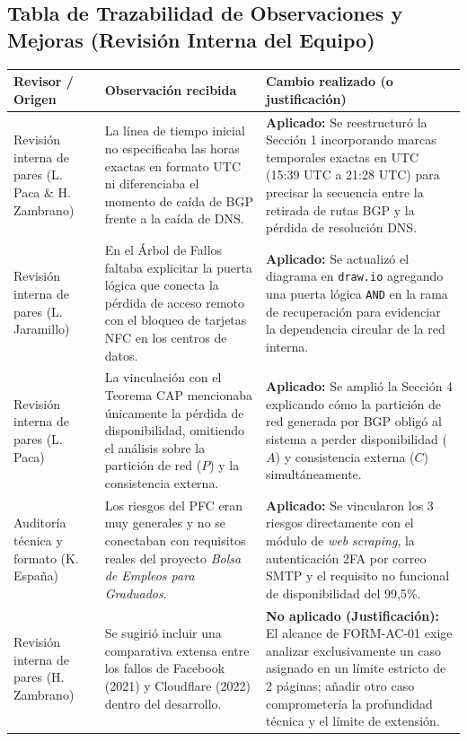 \documentclass[10pt,a4paper]{article}
\renewcommand{\arraystretch}{1.05}
\begin{document}
\begin{table}[t]
\subsection*{Tabla de Trazabilidad de Observaciones y Mejoras (Revisión Interna del Equipo)}
\centering
\scriptsize
\renewcommand{\arraystretch}{1.25}
\begin{tabularx}{\textwidth}{|p{}|X|X|}
\hline
\textbf{Revisor / Origen} & \textbf{Observación recibida} & \textbf{Cambio realizado (o justificación)} \\ \hline
Revisión interna de pares (L. Paca \& H. Zambrano) & La línea de tiempo inicial no especificaba las horas exactas en formato UTC ni diferenciaba el momento de caída de BGP frente a la caída de DNS. & \textbf{Aplicado:} Se reestructuró la Sección 1 incorporando marcas temporales exactas en UTC (15:39 UTC a 21:28 UTC) para precisar la secuencia entre la retirada de rutas BGP y la pérdida de resolución DNS. \\ \hline
Revisión interna de pares (L. Jaramillo) & En el Árbol de Fallos faltaba explicitar la puerta lógica que conecta la pérdida de acceso remoto con el bloqueo de tarjetas NFC en los centros de datos. & \textbf{Aplicado:} Se actualizó el diagrama en \texttt{draw.io} agregando una puerta lógica \texttt{AND} en la rama de recuperación para evidenciar la dependencia circular de la red interna. \\ \hline
Revisión interna de pares (L. Paca) & La vinculación con el Teorema CAP mencionaba únicamente la pérdida de disponibilidad, omitiendo el análisis sobre la partición de red ($P$) y la consistencia externa. & \textbf{Aplicado:} Se amplió la Sección 4 explicando cómo la partición de red generada por BGP obligó al sistema a perder disponibilidad ($A$) y consistencia externa ($C$) simultáneamente. \\ \hline
Auditoría técnica y formato (K. España) & Los riesgos del PFC eran muy generales y no se conectaban con requisitos reales del proyecto \textit{Bolsa de Empleos para Graduados}. & \textbf{Aplicado:} Se vincularon los 3 riesgos directamente con el módulo de \textit{web scraping}, la autenticación 2FA por correo SMTP y el requisito no funcional de disponibilidad del 99,5\%. \\ \hline
Revisión interna de pares (H. Zambrano) & Se sugirió incluir una comparativa extensa entre los fallos de Facebook (2021) y Cloudflare (2022) dentro del desarrollo. & \textbf{No aplicado (Justificación):} El alcance de FORM-AC-01 exige analizar exclusivamente un caso asignado en un límite estricto de 2 páginas; añadir otro caso comprometería la profundidad técnica y el límite de extensión. \\ \hline
\end{tabularx}
\label{tab:trazabilidad}
\end{table}
\end{document}
